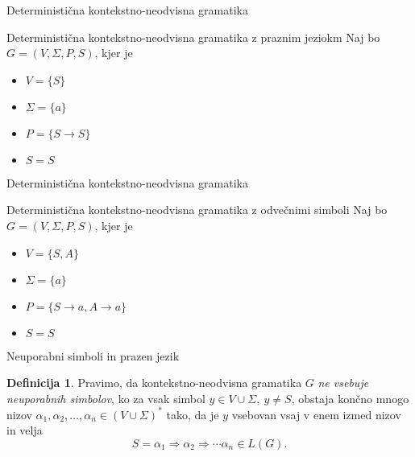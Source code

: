 \documentclass{beamer}
\theoremstyle{definition} %
\newtheorem{definicija}{Definicija}[section]
\begin{document}
\begin{frame}{Deterministična kontekstno-neodvisna gramatika}
    \begin{exampleblock}{Deterministična kontekstno-neodvisna gramatika z praznim jeziokm}
        Naj bo $ G = ( V, \Sigma, P, S ) $, kjer je 
        \begin{itemize}
            \item<2-> $ V = \{ S \} $
            \item<3-> $ \Sigma = \{ a \} $
            \item<4-> $P = \{ S \rightarrow S \} $
            \item<5-> $ S = S $
        \end{itemize}
        \pause
    \end{exampleblock}
\end{frame}

\begin{frame}{Deterministična kontekstno-neodvisna gramatika}
    \begin{exampleblock}{Deterministična kontekstno-neodvisna gramatika z odvečnimi simboli}
        Naj bo $ G = ( V, \Sigma, P, S ) $, kjer je 
        \begin{itemize}
            \item $ V = \{ S, A \} $
            \item $ \Sigma = \{ a \} $
            \item $P = \{ S \rightarrow a, A \rightarrow a \} $
            \item $ S = S $
        \end{itemize}
        \pause
    \end{exampleblock}
\end{frame}

\begin{frame}{Neuporabni simboli in prazen jezik}
    \begin{definicija}
        Pravimo, da kontekstno-neodvisna gramatika $G$ \textit{ne vsebuje neuporabnih simbolov}, ko za vsak simbol
        $ y \in V \cup \Sigma, \ y \neq S $, obstaja končno mnogo nizov $ \alpha_1, \alpha_2, \ldots, \alpha_n \in 
        (V \cup \Sigma)^* $ tako, da je $y$ vsebovan vsaj v enem izmed nizov in velja
        \[
            S = \alpha_1 \Rightarrow \alpha_2 \Rightarrow \cdots \alpha_n \in L(G).
        \] 
    \end{definicija}
\end{frame}
\end{document}
